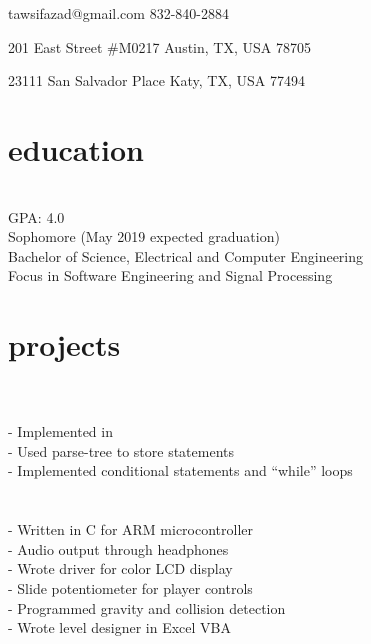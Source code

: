 \documentclass[12pt]{cv}
\begin{document}
\leftskip 8pc
\begin{flushright}

\vspace{0.5pc}
\contact
    {tawsifazad@gmail.com}
    {832-840-2884}

\address
    {Present}
    {201 East  Street \#M0217}
    {Austin, TX, USA}
    {78705}

\address
    {Permanent}
    {23111 San Salvador Place}
    {Katy, TX, USA}
    {77494}
\end{flushright}

\vspace{1pc}
\section{education}
 \hfill {} \\
GPA: 4.0 \\
Sophomore (May 2019 expected graduation) \\
Bachelor of Science, Electrical and Computer Engineering \\
Focus in Software Engineering and Signal Processing \\

\section{projects}
 \hfill {} \\
 \\
- Implemented in \CC \\
- Used parse-tree to store statements \\
- Implemented conditional statements and ``while'' loops \\


 \hfill {} \\
 \\
- Written in C for ARM microcontroller \\
- Audio output through headphones \\
- Wrote driver for color LCD display \\
- Slide potentiometer for player controls \\
- Programmed gravity and collision detection \\
- Wrote level designer in Excel VBA \\
\end{document}
